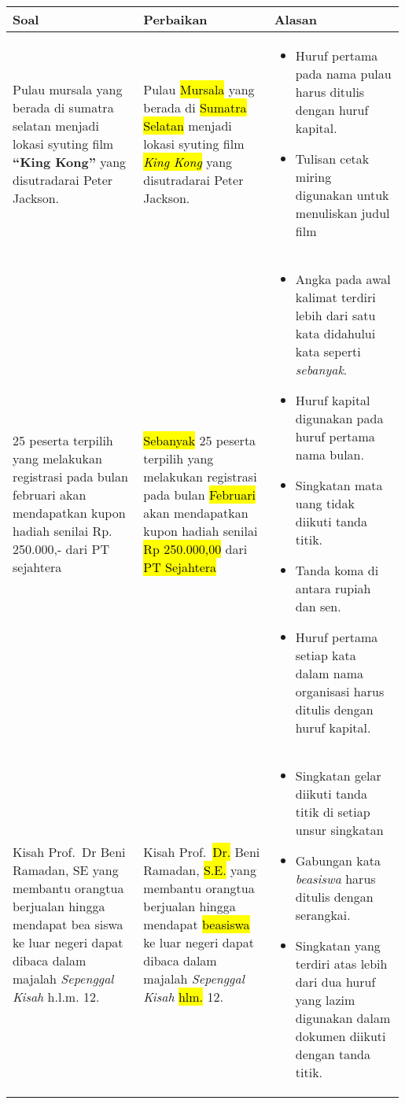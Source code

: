 \documentclass[
	10pt, %
	indonesian
]{assignment}
\begin{document}
\begin{center}
	\begin{longtable}{ p{0.33\linewidth} | p{0.33\linewidth} | p{0.33\linewidth}}
		Soal & Perbaikan & Alasan                                                                                            \\
		\toprule

		Pulau mursala yang berada di sumatra selatan menjadi lokasi
		syuting film \textbf{“King Kong”} yang disutradarai Peter Jackson.
		     &
		Pulau \hl{Mursala} yang berada di \hl{Sumatra Selatan} menjadi lokasi
		syuting film \hl{\textit{King Kong}} yang disutradarai Peter Jackson.
		     &
		\begin{itemize}
			\item Huruf pertama pada nama pulau harus ditulis dengan huruf kapital.
			\item Tulisan cetak miring digunakan untuk menuliskan judul film
		\end{itemize}                                               \\

		\midrule

		25 peserta terpilih yang melakukan registrasi pada bulan februari akan
		mendapatkan kupon hadiah senilai Rp. 250.000,- dari PT sejahtera
		     &
		\hl{Sebanyak} 25 peserta terpilih yang melakukan registrasi pada bulan \hl{Februari} akan
		mendapatkan kupon hadiah senilai \hl{Rp 250.000,00} dari \hl{PT Sejahtera}
		     &
		\begin{itemize}
			\item Angka pada awal kalimat terdiri lebih dari satu kata didahului kata seperti \textit{sebanyak}.
			\item Huruf kapital digunakan pada huruf pertama nama bulan.
			\item Singkatan mata uang tidak diikuti tanda titik.
			\item Tanda koma di antara rupiah dan sen.
			\item Huruf pertama setiap kata dalam nama organisasi harus ditulis dengan huruf kapital.
		\end{itemize}                  \\

		\midrule

		Kisah Prof.\ Dr Beni Ramadan, SE yang membantu orangtua berjualan hingga
		mendapat bea siswa ke luar negeri dapat dibaca dalam majalah \textit{Sepenggal Kisah}
		h.l.m. 12.
		     &
		Kisah Prof.\ \hl{Dr.} Beni Ramadan, \hl{S.E.} yang membantu orangtua berjualan hingga
		mendapat \hl{beasiswa} ke luar negeri dapat dibaca dalam majalah \textit{Sepenggal Kisah}
		\hl{hlm.} 12.
		     &
		\begin{itemize}
			\item Singkatan gelar diikuti tanda titik di setiap unsur singkatan
			\item Gabungan kata \textit{beasiswa} harus ditulis dengan serangkai.
			\item Singkatan yang terdiri atas lebih dari dua huruf yang lazim digunakan dalam dokumen diikuti dengan tanda titik.
		\end{itemize} \\


\end{longtable}
\end{center}
\end{document}

